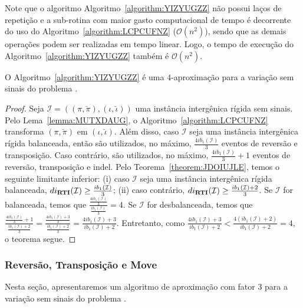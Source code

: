 Note que o algoritmo Algoritmo~\ref{algorithm:YIZYUGZZ} não possui laços de repetição e a sub-rotina com maior gasto computacional de tempo é decorrente do uso do Algoritmo~\ref{algorithm:LCPCUFNZ} ($\mathcal{O}(n^2)$), sendo que as demais operações podem ser realizadas em tempo linear. Logo, o tempo de execução do Algoritmo~\ref{algorithm:YIZYUGZZ} também é $\mathcal{O}(n^2)$.

\begin{theorem}\label{theorem:ZEIGUWRR}
O Algoritmo~\ref{algorithm:YIZYUGZZ} é uma $4$-aproximação para a variação sem sinais do problema \SbIRTI{}.
\end{theorem}
\begin{proof}
Seja $\mathcal{I} = ((\pi,\breve\pi),(\iota,\breve\iota))$ uma instância intergênica rígida sem sinais. Pelo Lema~\ref{lemma:MUTXDAUG}, o Algoritmo~\ref{algorithm:LCPCUFNZ} transforma $(\pi,\breve\pi)$ em $(\iota,\breve\iota)$. Além disso, caso $\mathcal{I}$ seja uma instância intergênica rígida balanceada, então são utilizados, no máximo, $\frac{4ib_1(\mathcal{I})}{3}$ eventos de reversão e transposição. Caso contrário, são utilizados, no máximo, $\frac{4ib_1(\mathcal{I})}{3} + 1$ eventos de reversão, transposição e indel. Pelo Teorema~\ref{theorem:JDOIUJLE}, temos o seguinte limitante inferior: (i) caso $\mathcal{I}$ seja uma instância intergênica rígida balanceada, $di_{\textbf{RTI}}(\mathcal{I}) \ge \frac{ib_1(\mathcal{I})}{3}$; (ii) caso contrário, $di_{\textbf{RTI}}(\mathcal{I}) \ge \frac{ib_1(\mathcal{I}) + 2}{3}$. Se $\mathcal{I}$ for balanceada, temos que $\frac{\frac{4ib_1(\mathcal{I})}{3}}{\frac{ib_1(\mathcal{I})}{3}}=4$. Se $\mathcal{I}$ for desbalanceada,  temos que $\frac{\frac{4ib_1(\mathcal{I})}{3} + 1}{\frac{ib_1(\mathcal{I}) + 2}{3}}=\frac{\frac{4ib_1(\mathcal{I})+3}{3}}{\frac{ib_1(\mathcal{I}) + 2}{3}}=\frac{4ib_1(\mathcal{I})+3}{ib_1(\mathcal{I})+2}$. Entretanto, como $\frac{4ib_1(\mathcal{I})+3}{ib_1(\mathcal{I})+2}<\frac{4(ib_1(\mathcal{I})+2)}{ib_1(\mathcal{I})+2}=4$, o teorema segue.
\end{proof}

\subsubsection{Reversão, Transposição e Move}

Nesta seção, apresentaremos um algoritmo de aproximação com fator $3$ para a variação sem sinais do problema \SbIRTM{}. 

